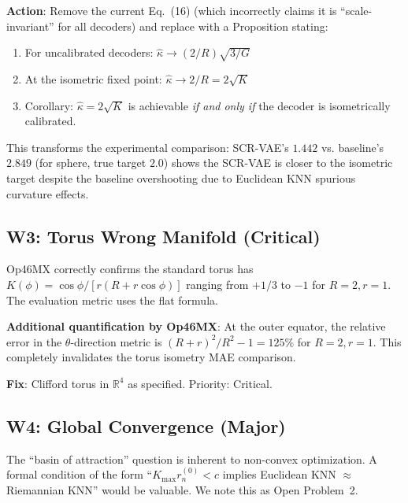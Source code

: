 \documentclass{article}
\begin{document}
\begin{correct}
\textbf{Action}: Remove the current Eq.~(16) (which incorrectly claims it is
``scale-invariant'' for all decoders) and replace with a Proposition stating:
\begin{enumerate}
  \item For uncalibrated decoders: $\hat{\kappa} \to (2/R)\sqrt{3/G}$
  \item At the isometric fixed point: $\hat{\kappa} \to 2/R = 2\sqrt{K}$
  \item Corollary: $\hat{\kappa} = 2\sqrt{K}$ is achievable \emph{if and only
    if} the decoder is isometrically calibrated.
\end{enumerate}
This transforms the experimental comparison: SCR-VAE's $1.442$ vs. baseline's
$2.849$ (for sphere, true target $2.0$) shows the SCR-VAE is closer to the
isometric target despite the baseline overshooting due to Euclidean KNN
spurious curvature effects.
\end{correct}

\subsection{W3: Torus Wrong Manifold (Critical)}

\begin{accept}
Op46MX correctly confirms the standard torus has
$K(\phi) = \cos\phi/[r(R+r\cos\phi)]$ ranging from $+1/3$ to $-1$ for $R=2, r=1$.
The evaluation metric uses the flat formula.

\textbf{Additional quantification by Op46MX}: At the outer equator, the relative
error in the $\theta$-direction metric is $(R+r)^2/R^2 - 1 = 125\%$ for $R=2, r=1$.
This completely invalidates the torus isometry MAE comparison.

\textbf{Fix}: Clifford torus in $\mathbb{R}^4$ as specified. Priority: Critical.
\end{accept}

\subsection{W4: Global Convergence (Major)}

\begin{partial}
The ``basin of attraction'' question is inherent to non-convex optimization.
A formal condition of the form ``$K_{\max} r_n^{(0)} < c$ implies Euclidean
KNN $\approx$ Riemannian KNN'' would be valuable. We note this as Open
Problem~2.
\end{partial}
\end{document}
